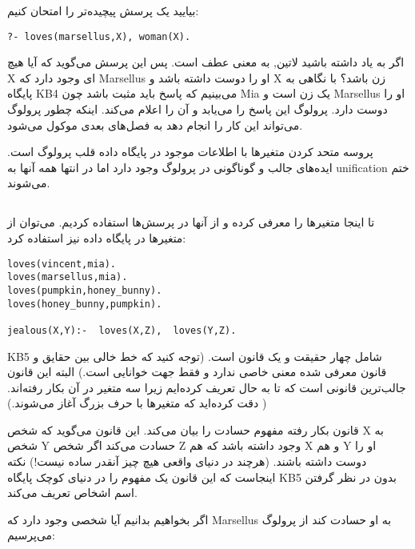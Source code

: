 بیایید یک پرسش پیچیده‌تر را امتحان کنیم:

\begin{latin}
\begin{lstlisting}
?- loves(marsellus,X), woman(X).
\end{lstlisting}
\end{latin}

اگر به یاد داشته باشید ‌لاتین{,} به معنی عطف است. پس این پرسش می‌گوید که آیا هیچ X ای وجود دارد که Marsellus او را دوست داشته باشد و X زن باشد؟ با نگاهی به پایگاه KB4 می‌بینیم که پاسخ باید مثبت باشد چون Mia یک زن است و Marsellus او را دوست دارد. پرولوگ این پاسخ را می‌یابد و آن را اعلام می‌کند. اینکه چطور پرولوگ می‌تواند این کار را انجام دهد به فصل‌های بعدی موکول می‌شود.

پروسه متحد کردن متغیرها با اطلاعات موجود در پایگاه داده قلب پرولوگ است. ایده‌های جالب و گوناگونی در پرولوگ وجود دارد اما در انتها همه آنها به unification ختم می‌شوند.\\

\subsection{}
تا اینجا متغیرها را معرفی کرده و از آنها در پرسش‌ها استفاده کردیم. می‌توان از متغیرها در پایگاه داده نیز استفاده کرد:

\begin{latin}
\begin{lstlisting}[title=KB5]
loves(vincent,mia). 
loves(marsellus,mia). 
loves(pumpkin,honey_bunny). 
loves(honey_bunny,pumpkin). 
    
jealous(X,Y):-  loves(X,Z),  loves(Y,Z).
\end{lstlisting}
\end{latin}

KB5 شامل چهار حقیقت و یک قانون است. (توجه کنید که خط خالی بین حقایق و قانون معرفی شده معنی خاصی ندارد و فقط جهت خوانایی است.) البته این قانون جالب‌ترین قانونی است که تا به حال تعریف کرده‌ایم زیرا سه متغیر در آن بکار رفته‌اند. ( دقت کرده‌اید که متغیرها با حرف بزرگ آغاز می‌شوند.) 

قانون بکار رفته مفهوم حسادت را بیان می‌کند. این قانون می‌گوید که شخص X به شخص Y حسادت می‌کند اگر شخص Z وجود داشته باشد که هم X و هم Y او را دوست داشته باشند. (هرچند در دنیای واقعی هیچ چیز آنقدر ساده نیست!) نکته اینجاست که این قانون یک مفهوم را در دنیای کوچک پایگاه KB5 بدون در نظر گرفتن اسم اشخاص تعریف می‌کند.

اگر بخواهیم بدانیم آیا شخصی وجود دارد که Marsellus به او حسادت کند از پرولوگ می‌پرسیم:

